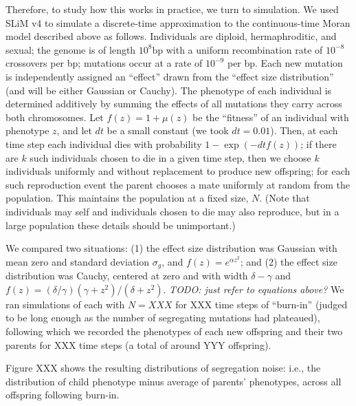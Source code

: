 \documentclass{article}
\newcommand{\comment}[1]{{\color{blue} \it #1}}
\theoremstyle{remark}
\theoremstyle{definition}
\begin{document}
Therefore,
to study how this works in practice, we turn to simulation.
We used SLiM v4 \citep{haller2022slim4}
to simulate a discrete-time approximation to the continuous-time Moran model described above
as follows.
Individuals are diploid, hermaphroditic, and sexual;
the genome is of length $10^8$bp with a uniform recombination rate of $10^{-8}$ crossovers per bp;
mutations occur at a rate of $10^{-9}$ per bp.
Each new mutation is independently assigned an ``effect''
drawn from the ``effect size distribution'' (and will be either Gaussian or Cauchy).
The phenotype of each individual is determined additively
by summing the effects of all mutations they carry across both chromosomes.
Let $f(z) = 1 + \mu(z)$
be the ``fitness'' of an individual with phenotype $z$,
and let $dt$ be a small constant (we took $dt=0.01$).
Then, at each time step
each individual dies with probability $1 - \exp(-dt f(z))$;
if there are $k$ such individuals chosen to die in a given time step,
then we choose $k$ individuals uniformly and without replacement
to produce new offspring;
for each such reproduction event the parent chooses a mate uniformly at random from the population.
This maintains the population at a fixed size, $N$.
(Note that individuals may self and individuals chosen to die may also reproduce,
but in a large population these details should be unimportant.)

We compared two situations:
(1) the effect size distribution was Gaussian with mean zero and standard deviation $\sigma_g$,
and $f(z) = e^{\alpha z^2}$; and
(2) the effect size distribution was Cauchy, centered at zero and with width $\delta - \gamma$
and $f(z) = (\delta/\gamma) (\gamma + z^2) / (\delta + z^2)$.
\comment{TODO: just refer to equations above?}
We ran simulations of each with $N=XXX$ for XXX time steps of ``burn-in''
(judged to be long enough as the number of segregating mutations had plateaued),
following which we recorded the phenotypes of each new offspring and their two parents
for XXX time steps (a total of around YYY offspring).

Figure XXX shows the resulting distributions of segregation noise:
i.e., the distribution of child phenotype minus average of parents' phenotypes,
across all offspring following burn-in.
\end{document}
